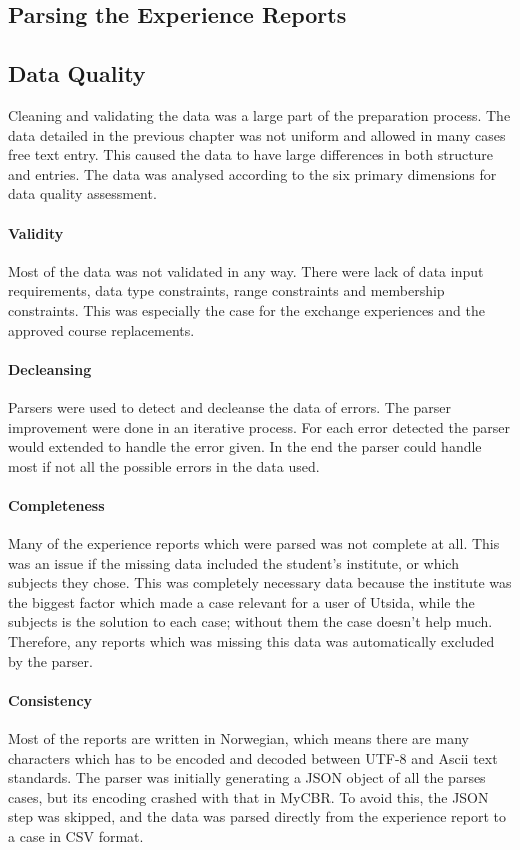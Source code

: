 \subsection{Parsing the Experience Reports}

\subsection{Data Quality}
Cleaning and validating the data was a large part of the preparation process. The data detailed in the previous chapter was not uniform and allowed in many cases free text entry. This caused the data to have large differences in both structure and entries. The data was analysed according to the six primary dimensions for data quality assessment\cite{askham2013six}.

\paragraph{Validity} Most of the data was not validated in any way. There were lack of data input requirements, data type constraints, range constraints and membership constraints. This was especially the case for the exchange experiences and the approved course replacements.


\paragraph{Decleansing} Parsers were used to detect and decleanse the data of errors. The parser improvement were done in an iterative process. For each error detected the parser would extended to handle the error given. In the end the parser could handle most if not all the possible errors in the data used. 

\paragraph{Completeness}
Many of the experience reports which were parsed was not complete at all. This was an issue if the missing data included the student's institute, or which subjects they chose. This was completely necessary data because the institute was the biggest factor which made a case relevant for a user of Utsida, while the subjects is the solution to each case; without them the case doesn't help much. Therefore, any reports which was missing this data was automatically excluded by the parser.

\paragraph{Consistency}
Most of the reports are written in Norwegian, which means there are many characters which has to be encoded and decoded between UTF-8 and Ascii text standards. The parser was initially generating a JSON object of all the parses cases, but its encoding crashed with that in MyCBR. To avoid this, the JSON step was skipped, and the data was parsed directly from the experience report to a case in CSV format.

